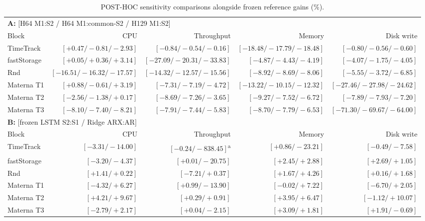 \documentclass[5p,twocolumn]{elsarticle}
\begin{document}
\begin{table}[t]
  \caption{POST-HOC sensitivity comparisons alongside frozen reference gains (\%).}
  \label{tab:posthoc-controls}
  \centering
  \small
  \setlength{\tabcolsep}{2pt}
  \renewcommand{\arraystretch}{1.12}
  \begin{tabular*}{\textwidth}{@{\extracolsep{\fill}}lrrrr@{}}
    \toprule
    \multicolumn{5}{l}{\textbf{A:} [H64 M1:S2 / H64 M1:common-S2 / H129 M1:S2]} \\
    Block & CPU & Throughput & Memory & Disk write \\
    \midrule
    TimeTrack & $[+0.47/-0.81/-2.93]$ & $[-0.84/-0.54/-0.16]$ & $[-18.48/-17.79/-18.48]$ & $[-0.80/-0.56/-0.60]$ \\
    fastStorage & $[+0.05/+0.36/+3.14]$ & $[-27.09/-20.31/-33.83]$ & $[-4.87/-4.43/-4.19]$ & $[-4.07/-1.75/-4.05]$ \\
    Rnd & $[-16.51/-16.32/-17.57]$ & $[-14.32/-12.57/-15.56]$ & $[-8.92/-8.69/-8.06]$ & $[-5.55/-3.72/-6.85]$ \\
    Materna T1 & $[+0.88/-0.61/+3.19]$ & $[-7.31/-7.19/-4.72]$ & $[-13.22/-10.15/-12.32]$ & $[-27.46/-27.98/-24.62]$ \\
    Materna T2 & $[-2.56/-1.38/+0.17]$ & $[-8.69/-7.26/-3.65]$ & $[-9.27/-7.52/-6.72]$ & $[-7.89/-7.93/-7.20]$ \\
    Materna T3 & $[-8.10/-7.40/-8.21]$ & $[-7.91/-7.44/-5.83]$ & $[-8.70/-7.79/-6.53]$ & $[-71.30/-69.67/-64.00]$ \\
    \midrule
    \multicolumn{5}{l}{\textbf{B:} [frozen LSTM S2:S1 / Ridge ARX:AR]} \\
    Block & CPU & Throughput & Memory & Disk write \\
    \midrule
    TimeTrack & $[-3.31/-14.00]$ & $[-0.24/-838.45]$\textsuperscript{a} & $[+0.86/-23.21]$ & $[-0.49/-7.58]$ \\
    fastStorage & $[-3.20/-4.37]$ & $[+0.01/-20.75]$ & $[+2.45/+2.88]$ & $[+2.69/+1.05]$ \\
    Rnd & $[+1.41/+0.22]$ & $[-7.21/+0.37]$ & $[+1.67/+4.26]$ & $[+0.16/+1.68]$ \\
    Materna T1 & $[-4.32/+6.27]$ & $[+0.99/-13.90]$ & $[-0.02/+7.22]$ & $[-6.70/+2.05]$ \\
    Materna T2 & $[+4.21/+9.67]$ & $[+0.29/+0.91]$ & $[+3.95/+6.47]$ & $[-1.12/+10.07]$ \\
    Materna T3 & $[-2.79/+2.17]$ & $[+0.04/-2.15]$ & $[+3.09/+1.81]$ & $[+1.91/-0.69]$ \\

\end{tabular*}
\end{table}
\end{document}
